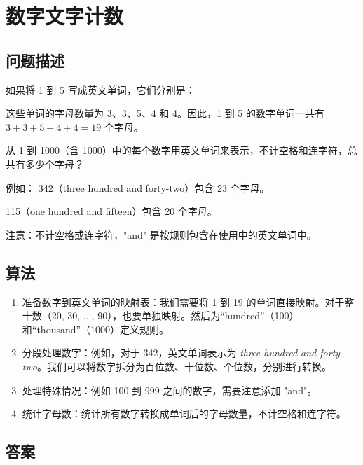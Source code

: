 \section{数字文字计数}
\subsection{问题描述}
\begin{tcolorbox}
	如果将 1 到 5 写成英文单词，它们分别是：

	\begin{itemize}
	\end{itemize}
	这些单词的字母数量为 3、3、5、4 和 4。因此，1 到 5 的数字单词一共有
	$ 3 + 3 + 5 + 4 + 4 = 19 $
	个字母。

	从 1 到 1000（含 1000）中的每个数字用英文单词来表示，不计空格和连字符，总共有多少个字母？

	例如：
	342（three hundred and forty-two）包含 23 个字母。

	115（one hundred and fifteen）包含 20 个字母。

	注意：不计空格或连字符，"and" 是按规则包含在使用中的英文单词中。
\end{tcolorbox}

\subsection{算法}
\begin{enumerate}
	\item 准备数字到英文单词的映射表：我们需要将 1 到 19 的单词直接映射。对于整十数（20, 30, ..., 90），也要单独映射。然后为“hundred”（100）和“thousand”（1000）定义规则。
	\item 分段处理数字：例如，对于 342，英文单词表示为 \textit{three hundred and forty-two}。我们可以将数字拆分为百位数、十位数、个位数，分别进行转换。
	\item 处理特殊情况：例如 100 到 999 之间的数字，需要注意添加 "and"。
	\item 统计字母数：统计所有数字转换成单词后的字母数量，不计空格和连字符。
\end{enumerate}

\subsection{答案}
